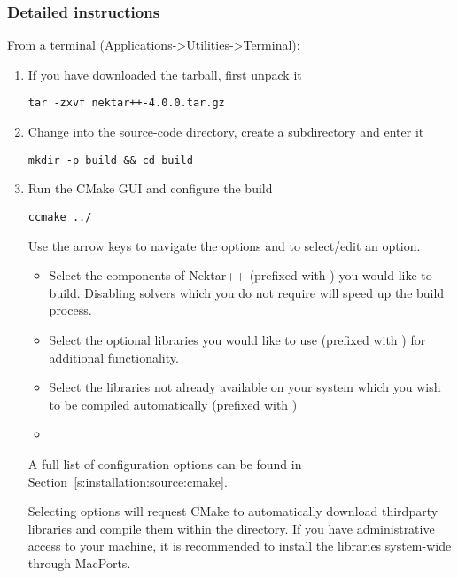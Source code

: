 \subsubsection{Detailed instructions}
From a terminal (Applications->Utilities->Terminal):
\begin{enumerate}
    \item If you have downloaded the tarball, first unpack it
    \begin{lstlisting}[style=BashInputStyle]
    tar -zxvf nektar++-4.0.0.tar.gz
    \end{lstlisting}

    \item Change into the source-code directory, create a 
    subdirectory and enter it 
    \begin{lstlisting}[style=BashInputStyle]
    mkdir -p build && cd build
    \end{lstlisting}
    
    \item Run the CMake GUI and configure the build
    \begin{lstlisting}[style=BashInputStyle]
    ccmake ../
    \end{lstlisting}
    Use the arrow keys to navigate the options and  to select/edit
    an option.
    \begin{itemize}
        \item Select the components of Nektar++ (prefixed with
        ) you would like to build. Disabling solvers
        which you do not require will speed up the build process.
        \item Select the optional libraries you would like to use (prefixed with
        ) for additional functionality.
        \item Select the libraries not already available on your system which
        you wish to be compiled automatically (prefixed with 
        )
        \item 
    \end{itemize}
    A full list of configuration options can be found in
    Section~\ref{s:installation:source:cmake}.

    \begin{notebox}
    Selecting  options will request CMake to
    automatically download thirdparty libraries and compile them within the
    \nekpp directory. If you have administrative access to your machine, it is
    recommended to install the libraries system-wide through MacPorts.
    \end{notebox}
    

\end{enumerate}
